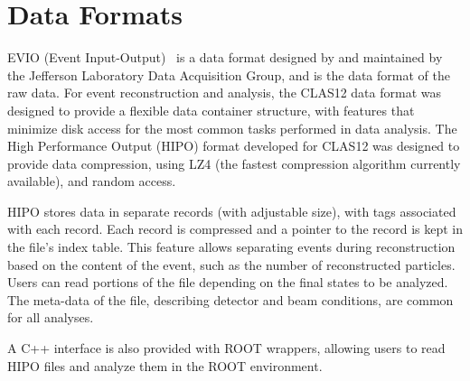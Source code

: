 \section{Data Formats}
\label{sec-formats}

EVIO (Event Input-Output)~\cite{evio} is a data format designed by and maintained by the Jefferson Laboratory
Data Acquisition Group, and is the data format of the raw data. For event reconstruction and analysis, the CLAS12
data format was designed to provide a flexible data container structure, with features that minimize disk access
for the most common tasks performed in data analysis. The High Performance Output (HIPO) format developed for
CLAS12 was designed to provide data compression, using LZ4 (the fastest compression algorithm currently available),
and random access.

HIPO stores data in separate records (with adjustable size), with tags associated with each record. Each record
is compressed and a pointer to the record is kept in the file's index table. This feature allows separating events
during reconstruction based on the content of the event, such as the number of reconstructed particles. Users can
read portions of the file depending on the final states to be analyzed.  The meta-data of the file, describing detector
and beam conditions, are common for all analyses.

A C++ interface is also provided with ROOT wrappers, allowing users to read HIPO files and analyze them in the
ROOT environment.

